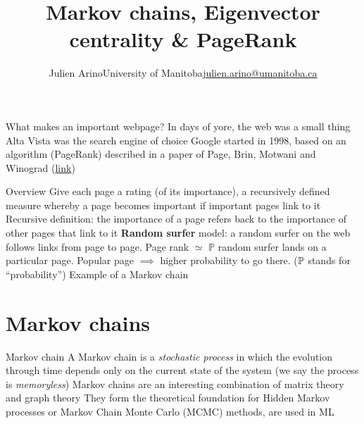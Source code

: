 \documentclass[aspectratio=169]{beamer}\usepackage[]{graphicx}\usepackage[]{xcolor}
\title{Markov chains, Eigenvector centrality \& PageRank}
\author{\texorpdfstring{Julien Arino\newline University of Manitoba\newline\url{julien.arino@umanitoba.ca}}{Julien Arino}}
\date{}
\begin{document}


\begin{frame}{What makes an important webpage?}
	In days of yore, the web was a small thing
	\vfill
	Alta Vista was the search engine of choice
	\vfill
	Google started in 1998, based on an algorithm (PageRank) described in a paper of Page, Brin, Motwani and Winograd (\href{https://storm.cis.fordham.edu/~gweiss/selected-papers/classic-pagerank-paper.pdf}{link})
\end{frame}

\begin{frame}{Overview}
	Give each page a rating (of its importance), a recursively defined measure whereby a page becomes important if important pages link to it
	\vfill
	Recursive definition: the importance of a page refers back to the importance of other pages that link to it
	\vfill
	\textbf{Random surfer} model: a random surfer on the web follows links from page to page. Page rank $\simeq$ $\mathbb{P}$ random surfer lands on a particular page. Popular page $\implies$ higher probability to go there.  
	($\mathbb{P}$ stands for ``probability'')
	\vfill Example of a Markov chain
\end{frame}

\section{Markov chains}

\begin{frame}{Markov chain}
	A Markov chain is a \emph{stochastic process} in which the evolution through time depends only on the current state of the system (we say the process is \emph{memoryless})
	\vfill
	Markov chains are an interesting combination of matrix theory and graph theory
	\vfill
	They form the theoretical foundation for Hidden Markov processes or Markov Chain Monte Carlo (MCMC) methods, are used in ML
\end{frame}
\end{document}
